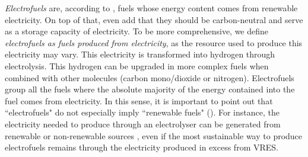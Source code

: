 

\textit{Electrofuels} are, according to \citet{JRC_alternative}, fuels whose energy content comes from renewable electricity. On top of that, \citet{goldmann2018} even add that they should be carbon-neutral and serve as a storage capacity of electricity. To be more comprehensive, we define \textit{electrofuels as fuels produced from electricity}, as the resource used to produce this electricity may vary. This electricity is transformed into hydrogen through electrolysis. This hydrogen can be upgraded in more complex fuels when combined with other molecules (\eg carbon mono/dioxide or nitrogen). Electrofuels group all the fuels where the absolute majority of the energy contained into the fuel comes from electricity. In this sense, it is important to point out that ``electrofuels" do not especially imply ``renewable fuels" (). For instance, the electricity needed to produce  through an electrolyser can be generated from renewable or non-renewable sources \cite{bhandari2014}, even if the most sustainable way to produce electrofuels remains through the electricity produced in excess from \gls{VRES}.

